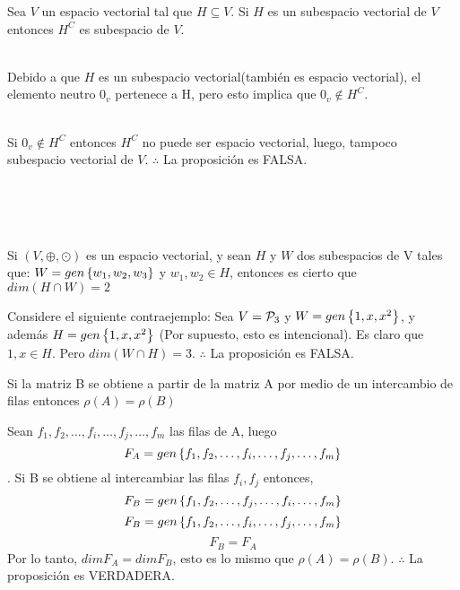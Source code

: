 \begin{enumerate}
\begin{prop}
Sea $V$ un espacio vectorial tal que $H\subseteq V$. Si $H$ es un subespacio vectorial de $V$ entonces $H^C$ es subespacio de $V$.

\end{prop}

\sol
~\\
Debido a que $H$ es un subespacio vectorial(también es espacio vectorial), el elemento neutro $0_v$ pertenece a H, pero esto implica que $0_v \notin H^C$.

~\\
Si $0_v \notin H^C$ entonces $H^C$ no puede ser espacio vectorial, luego, tampoco subespacio vectorial de $ V$. 
$\therefore$ La proposición es FALSA.

~\\
~\\
~\\
\begin{prop}
Si $(V, \oplus, \odot)$ es un espacio vectorial, y sean $H$ y $W$ dos subespacios de V tales que:
$W=gen \left\{w_1, w_2, w_3 \right\} $ y $w_1, w_2  \in H$, entonces es cierto que $dim(H\cap W)=2$
\end{prop}

\sol
Considere el siguiente contraejemplo:
Sea $V={\cal P}_3$ y $W=gen \left\{1, x, x^2 \right\} $, y además $H=gen \left\{1, x, x^2 \right\} $ (Por supuesto, esto es intencional). Es claro que $1, x \in H$. Pero $dim(W\cap H)=3$.
$\therefore$ La proposición es FALSA.

\newpage
\begin{prop}
Si la matriz B se obtiene a partir de la matriz A por medio de un intercambio de filas entonces $\rho(A)=\rho(B)$
\end{prop}

\sol
Sean $f_1, f_2, \ldots, f_i, \ldots , f_j, \ldots, f_m$ las filas de A, luego $$F_A=gen \left\{f_1, f_2, \ldots, f_i, \ldots , f_j, \ldots, f_m \right\} $$. Si B se obtiene al intercambiar las filas $f_i, f_j$ entonces, 
$$F_B=gen \left\{f_1, f_2, \ldots, f_j, \ldots , f_i, \ldots, f_m \right\} $$
$$F_B=gen \left\{f_1, f_2, \ldots, f_i, \ldots , f_j, \ldots, f_m \right\} $$
$$F_B=F_A$$
Por lo tanto, $dimF_A=dim F_B$, esto es lo mismo que $\rho(A)=\rho(B)$.
$\therefore $ La proposición es VERDADERA.
~\\
~\\
~\\



\newpage


\newpage
\newpage



\end{enumerate}
